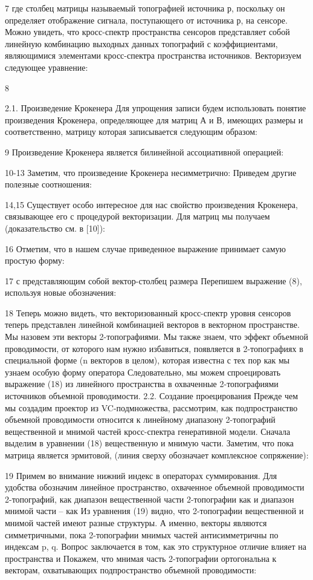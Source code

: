 7
где столбец матрицы называемый топографией источника р, поскольку он определяет отображение сигнала, поступающего от источника р, на сенсоре. Можно увидеть, что кросс-спектр пространства сенсоров представляет собой линейную комбинацию выходных данных топографий с коэффициентами, являющимися элементами кросс-спектра пространства источников. Векторизуем следующее уравнение:

8

2.1. Произведение Крокенера
Для упрощения записи будем использовать понятие произведения Крокенера, определяющее для матриц А и В, имеющих размеры и соответственно, матрицу которая записывается следующим образом: 

9
Произведение Крокенера является билинейной ассоциативной операцией:

10-13
Заметим, что произведение Крокенера несимметрично: Приведем другие полезные соотношения:

14,15
Существует особо интересное для нас свойство произведения Крокенера, связывающее его с процедурой векторизации. Для матриц мы получаем (доказательство см. в [10]):

16
Отметим, что в нашем случае приведенное выражение принимает самую простую форму:

17
с представляющим собой вектор-столбец размера 
Перепишем выражение (8), используя новые обозначения:

18
Теперь можно видеть, что векторизованный кросс-спектр уровня сенсоров теперь представлен линейной комбинацией векторов в векторном пространстве. Мы назовем эти векторы 2-топографиями. Мы также знаем, что эффект объемной проводимости, от которого нам нужно избавиться, появляется в 2-топографиях в специальной форме (n векторов в целом), которая известна с тех пор как мы узнаем особую форму оператора Следовательно, мы можем спроецировать выражение (18) из линейного пространства в охваченные 2-топографиями источников объемной проводимости.
2.2. Создание проецирования
Прежде чем мы создадим проектор из VC-подмножества, рассмотрим, как подпространство объемной проводимости относится к линейному диапазону 2-топографий вещественной и мнимой частей кросс-спектра генеративной модели.
Сначала выделим в уравнении (18) вещественную и мнимую части. Заметим, что пока матрица является эрмитовой, (линия сверху обозначает комплексное сопряжение):

19
Примем во внимание нижний индекс в операторах суммирования.
Для удобства обозначим линейное пространство, охваченное объемной проводимости 2-топографий, как диапазон вещественной части 2-топографии как и диапазон мнимой части – как 
Из уравнения (19) видно, что 2-топографии вещественной и мнимой частей имеют разные структуры. А именно, векторы являются симметричными, пока 2-топографии мнимых частей антисимметричны по индексам p, q. Вопрос заключается в том, как это структурное отличие влияет на пространства и Покажем, что мнимая часть 2-топографии ортогональна к векторам, охватывающих подпространство объемной проводимости: 

